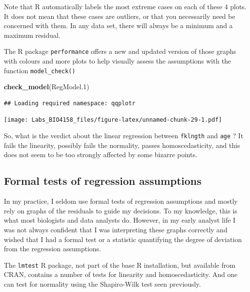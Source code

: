 \documentclass[
  12pt,
]{book}
\makeatletter
\newenvironment{Shaded}{\begin{snugshade}}{\end{snugshade}}
\newcommand{\FloatTok}[1]{\textcolor[rgb]{0.00,0.00,0.81}{#1}}
\newcommand{\KeywordTok}[1]{\textcolor[rgb]{0.13,0.29,0.53}{\textbf{#1}}}
\newcommand{\NormalTok}[1]{#1}
\newenvironment{kframe}{%
\medskip{}
\setlength{\fboxsep}{.8em}
\def\at@end@of@kframe{}%
\ifinner\ifhmode%
 \def\at@end@of@kframe{\end{minipage}}%
 \begin{minipage}{\columnwidth}%
\fi\fi%
\def\FrameCommand##1{\hskip\@totalleftmargin \hskip-\fboxsep
\colorbox{incolor}{##1}\hskip-\fboxsep
    \hskip-\linewidth \hskip-\@totalleftmargin \hskip\columnwidth}%
\MakeFramed {\advance\hsize-\width
  \@totalleftmargin\z@ \linewidth\hsize
  \@setminipage}}%
{\par\unskip\endMakeFramed%
\at@end@of@kframe}
\newenvironment{rmdblock}[1]
 {
 \begin{itemize}
 \renewcommand{\labelitemi}{
   \raisebox{-.7\height}[0pt][0pt]{
     {\setkeys{Gin}{width=3em,keepaspectratio}\texttt{[image: images/\#1]}}
   }
 }
 \begin{kframe}
 \setlength{\fboxsep}{1em}
 \item
 }
 {
 \end{kframe}
 \end{itemize}
 }
\newenvironment{rmdwarning}
  {\begin{rmdblock}{warning}}
  {\end{rmdblock}}
\makeatother
\begin{document}
\begin{rmdwarning}
Note that R automatically labels the most extreme cases on each of these 4 plots. It does not mean that these cases are outliers, or that you necessarily need be concerned with them. In any data set, there will always be a minimum and a maximum residual.
\end{rmdwarning}

The R package \texttt{performance} offers a new and updated version of those graphs with colours and more plots to help visually assess the assumptions with the function \texttt{model\_check()}

\begin{Shaded}
\begin{Highlighting}[]
\KeywordTok{check\_model}\NormalTok{(RegModel}\FloatTok{.1}\NormalTok{)}
\end{Highlighting}
\end{Shaded}

\begin{verbatim}
## Loading required namespace: qqplotr
\end{verbatim}

\texttt{[image: Labs\_BIO4158\_files/figure-latex/unnamed-chunk-29-1.pdf]}

So, what is the verdict about the linear regression between \texttt{fklngth} and \texttt{age} ? It fails the linearity, possibly fails the normality, passes homoscedasticity, and this does not seem to be too strongly affected by some bizarre points.

\hypertarget{formal-tests-of-regression-assumptions}{%
\subsection{Formal tests of regression assumptions}\label{formal-tests-of-regression-assumptions}}

In my practice, I seldom use formal tests of regression assumptions and mostly rely on graphs of the residuals to guide my decisions. To my knowledge, this is what most biologists and data analysts do. However, in my early analyst life I was not always confident that I was interpreting these graphs correctly and wished that I had a formal test or a statistic quantifying the degree of deviation from the regression assumptions.

The \texttt{lmtest} R package, not part of the base R installation, but available from CRAN, contains a number of tests for linearity and homoscedasticity. And one can test for normality using the Shapiro-Wilk test seen previously.
\end{document}
